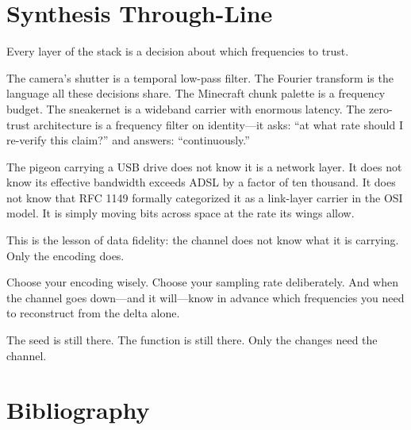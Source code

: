 \documentclass[11pt,letterpaper]{article}
\newenvironment{quoteblock}{%
  \begin{tcolorbox}[colback=LightBg,colframe=Primary,arc=2pt,left=10pt,right=10pt,top=8pt,bottom=8pt,breakable]
  \itshape
}{%
  \end{tcolorbox}
}
\begin{document}
\section{Synthesis Through-Line}

\begin{quoteblock}
Every layer of the stack is a decision about which frequencies to trust.

The camera's shutter is a temporal low-pass filter. The Fourier transform is the language all these decisions share. The Minecraft chunk palette is a frequency budget. The sneakernet is a wideband carrier with enormous latency. The zero-trust architecture is a frequency filter on identity---it asks: ``at what rate should I re-verify this claim?'' and answers: ``continuously.''

The pigeon carrying a USB drive does not know it is a network layer. It does not know its effective bandwidth exceeds ADSL by a factor of ten thousand. It does not know that RFC 1149 formally categorized it as a link-layer carrier in the OSI model. It is simply moving bits across space at the rate its wings allow.

This is the lesson of data fidelity: the channel does not know what it is carrying. Only the encoding does.

Choose your encoding wisely. Choose your sampling rate deliberately. And when the channel goes down---and it will---know in advance which frequencies you need to reconstruct from the delta alone.

The seed is still there. The function is still there. Only the changes need the channel.
\end{quoteblock}

\section{Bibliography}
\end{document}
